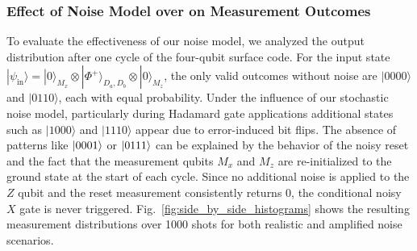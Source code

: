 \documentclass[9pt,a4paper,twocolumn,twoside]{tau-class/tau}
\begin{document}
\subsubsection*{Effect of Noise Model over on Measurement Outcomes}
To evaluate the effectiveness of our noise model, we analyzed the output distribution after one cycle of the four-qubit surface code. For the input state \( |\psi_{\text{in}}\rangle = |0\rangle_{M_x} \otimes |\Phi^+\rangle_{D_a, D_b} \otimes |0\rangle_{M_z} \), the only valid outcomes without noise are \( |0000\rangle \) and \( |0110\rangle \), each with equal probability. Under the influence of our stochastic noise model, particularly during Hadamard gate applications additional states such as \( |1000\rangle \) and \( |1110\rangle \) appear due to error-induced bit flips. The absence of patterns like $\ket{0001}$ or $\ket{0111}$ can be explained by the behavior of the noisy reset and the fact that the measurement qubits $M_x$ and $M_z$ are re-initialized to the ground state at the start of each cycle. Since no additional noise is applied to the $Z$ qubit and the reset measurement consistently returns 0, the conditional noisy $X$ gate is never triggered.
Fig.~\ref{fig:side_by_side_histograms} shows the resulting measurement distributions over 1000 shots for both realistic and amplified noise scenarios.
\end{document}
